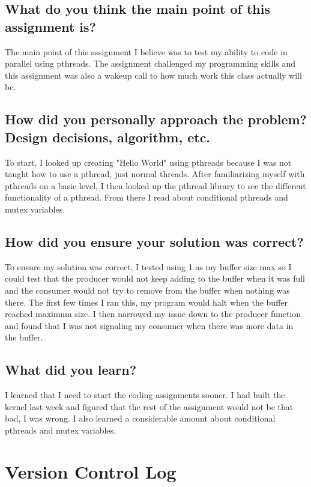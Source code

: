 \documentclass[letterpaper,10pt,titlepage,draftclsnofoot,onecolumn]{IEEEtran}
\begin{document}
\subsection{What do you think the main point of this assignment is?}
The main point of this assignment I believe was to test my ability to code in parallel using pthreads. The assignment challenged my programming skills and this assignment was also a wakeup call to how much work this class actually will be. 
\subsection{How did you personally approach the problem? Design decisions, algorithm, etc.}
To start, I looked up creating "Hello World" using pthreads because I was not taught how to use a pthread, just normal threads. After familiarizing myself with pthreads on a basic level, I then looked up the pthread library to see the different functionality of a pthread. From there I read about conditional pthreads and mutex variables. 
\subsection{How did you ensure your solution was correct?}
To ensure my solution was correct, I tested using 1 as my buffer size max so I could test that the producer would not keep adding to the buffer when it was full and the consumer would not try to remove from the buffer when nothing was there. The first few times I ran this, my program would halt when the buffer reached maximum size. I then narrowed my issue down to the producer function and found that I was not signaling my consumer when there was more data in the buffer.
\subsection{What did you learn?}
I learned that I need to start the coding assignments sooner. I had built the kernel last week and figured that the rest of the assignment would not be that bad, I was wrong. I also learned a considerable amount about conditional pthreads and mutex variables. 



\section{Version Control Log}
\end{document}
